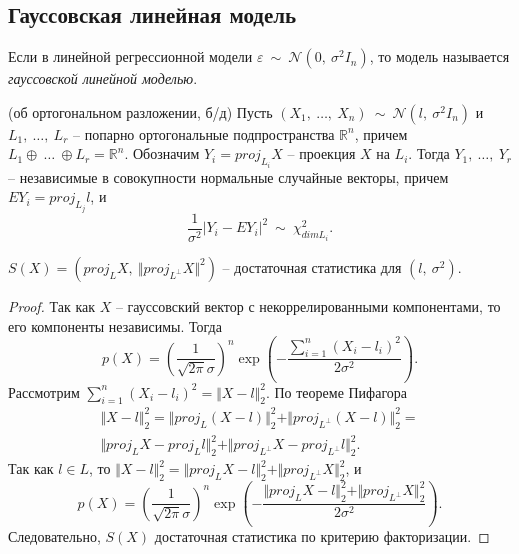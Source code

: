 \subsection{Гауссовская линейная модель}
\begin{definition}
    Если в линейной регрессионной модели $\displaystyle \varepsilon \ \sim \ \mathcal{N}\left( 0,\ \sigma ^{2} I_{n}\right)$, то модель называется \textit{гауссовской линейной моделью}.
\end{definition}
\begin{theorem}
    (об ортогональном разложении, б/д) Пусть $\displaystyle ( X_{1} ,\ \dotsc ,\ X_{n}) \ \sim \ \mathcal{N}\left( l,\ \sigma ^{2} I_{n}\right)$ и $\displaystyle L_{1} ,\ \dotsc ,\ L_{r}$ -- попарно ортогональные подпространства $\displaystyle \mathbb{R}^{n}$, причем $\displaystyle L_{1} \oplus \ \dotsc \ \oplus L_{r} =\mathbb{R}^{n}$. Обозначим $\displaystyle Y_{i} =proj_{L_{i}} X$ -- проекция $\displaystyle X$ на $\displaystyle L_{i}$. Тогда $\displaystyle Y_{1} ,\ \dotsc ,\ Y_{r}$ -- независимые в совокупности нормальные случайные векторы, причем $\displaystyle EY_{i} =proj_{L_{j}} l$, и
    \begin{equation*}
        \dfrac{1}{\sigma ^{2}}| Y_{i} -EY_{i}| ^{2} \ \sim \ \chi _{dimL_{i}}^{2} .
    \end{equation*}
\end{theorem}
\begin{proposition}
    $\displaystyle S( X) =\left( proj_{L} X,\ \Vert proj_{L^{\perp }} X\Vert ^{2}\right)$ -- достаточная статистика для $\displaystyle \left( l,\ \sigma ^{2}\right)$.
\end{proposition}
\begin{proof}
    Так как $\displaystyle X$ -- гауссовский вектор с некоррелированными компонентами, то его компоненты независимы. Тогда
    \begin{equation*}
        p( X) =\left(\dfrac{1}{\sqrt{2\pi } \sigma }\right)^{n}\exp\left( -\dfrac{\sum _{i=1}^{n}( X_{i} -l_{i})^{2}}{2\sigma ^{2}}\right) .
    \end{equation*}
    Рассмотрим $\displaystyle \sum _{i=1}^{n}( X_{i} -l_{i})^{2} =\Vert X-l\Vert _{2}^{2}$. По теореме Пифагора
    \begin{gather*}
        \Vert X-l\Vert _{2}^{2} =\Vert proj_{L}( X-l)\Vert _{2}^{2} +\Vert proj_{L^{\perp }}( X-l)\Vert _{2}^{2} =\\
        \Vert proj_{L} X-proj_{L} l\Vert _{2}^{2} +\Vert proj_{L^{\perp }} X-proj_{L^{\perp }} l\Vert _{2}^{2} .
    \end{gather*}
    Так как $\displaystyle l\in L$, то $\displaystyle \Vert X-l\Vert _{2}^{2} =\Vert proj_{L} X-l\Vert _{2}^{2} +\Vert proj_{L^{\perp }} X\Vert _{2}^{2}$, и
    \begin{equation*}
        p( X) =\left(\dfrac{1}{\sqrt{2\pi } \sigma }\right)^{n}\exp\left( -\dfrac{\Vert proj_{L} X-l\Vert _{2}^{2} +\Vert proj_{L^{\perp }} X\Vert _{2}^{2}}{2\sigma ^{2}}\right) .
    \end{equation*}
    Следовательно, $\displaystyle S( X)$ достаточная статистика по критерию факторизации.
\end{proof}
